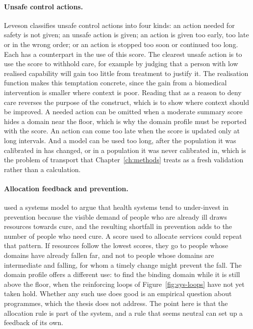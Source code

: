 \paragraph{Unsafe control actions.} Leveson classifies unsafe control actions
into four kinds: an action needed for safety is not given; an unsafe action is
given; an action is given too early, too late or in the wrong order; or an
action is stopped too soon or continued too long. Each has a counterpart in
the use of this score. The clearest unsafe action is to use the score to
withhold care, for example by judging that a person with low realised
capability will gain too little from treatment to justify it. The realisation
function makes this temptation concrete, since the gain from a biomedical
intervention is smaller where context is poor. Reading that as a reason to
deny care reverses the purpose of the construct, which is to show where
context should be improved. A needed action can be omitted when a moderate
summary score hides a domain near the floor, which is why the domain profile
must be reported with the score. An action can come too late when the score
is updated only at long intervals. And a model can be used too long, after the
population it was calibrated in has changed, or in a population it was never
calibrated in, which is the problem of transport that Chapter~\ref{ch:methods}
treats as a fresh validation rather than a calculation.

\paragraph{Allocation feedback and prevention.} \citet{bishai_2014} used a
systems model to argue that health systems tend to under-invest in prevention
because the visible demand of people who are already ill draws resources
towards cure, and the resulting shortfall in prevention adds to the number of
people who need cure. A score used to allocate services could repeat that
pattern. If resources follow the lowest scores, they go to people whose
domains have already fallen far, and not to people whose domains are
intermediate and falling, for whom a timely change might prevent the fall. The
domain profile offers a different use: to find the binding domain while it is
still above the floor, when the reinforcing loops of
Figure~\ref{fig:sys-loops} have not yet taken hold. Whether any such use does
good is an empirical question about programmes, which the thesis does not
address. The point here is that the allocation rule is part of the system, and
a rule that seems neutral can set up a feedback of its own.

